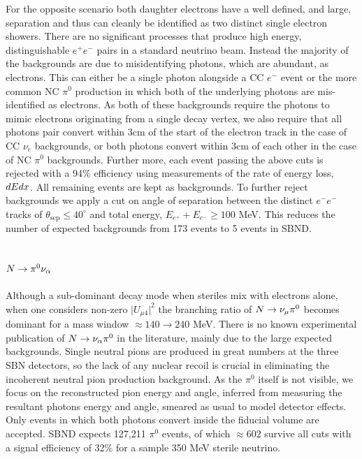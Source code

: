 \documentclass[11pt, a4paper]{article}
\def\ster{\ensuremath N}
\begin{document}
For the opposite scenario both daughter electrons have a well defined, and
large, separation and thus can cleanly be identified as two distinct single
electron showers. There are no significant processes that produce high energy,
distinguishable $e^+e^-$ pairs in a standard neutrino beam.  Instead the
majority of the backgrounds are due to misidentifying photons, which are
abundant, as electrons. This can either be a single photon alongside a CC $e^-$
event or the more common NC $\pi^0$ production in which both of the underlying
photons are mis-identified as electrons. As both of these backgrounds require
the photons to mimic electrons originating from a single decay vertex, we also
require that all photons pair convert within 3cm of the start of the electron
track in the case of CC $\nu_e$ backgrounds, or both photons convert within 3cm
of each other in the case of NC $\pi^0$ backgrounds. Further more, each event
passing the above cuts is rejected with a 94\% efficiency using measurements of
the rate of energy loss, $dE\/dx$. All remaining events are kept as
backgrounds. To further reject backgrounds we apply a cut on angle of
separation between the distinct $e^-e^-$ tracks of $\theta_\text{sep}\leq 40
^\circ$ and total energy, $E_{e^+}+E_{e^-} \geq 100$ MeV. This reduces the
number of expected backgrounds from 173 events to 5 events in SBND. 

\subsection{$\ster\rightarrow \pi^0 \nu_\alpha$}

Although a sub-dominant decay mode when steriles mix with electrons alone, when
one considers non-zero $\vert U_{\mu4}\vert^2$ the branching ratio of $\ster
\rightarrow \nu_\mu \pi^0$ becomes dominant for a mass window $\approx 140
\rightarrow 240$ MeV. There is no known experimental publication of $\ster
\rightarrow \nu_\alpha \pi^0$ in the literature, mainly due to the large
expected backgrounds. Single neutral pions are produced in great numbers at the
three SBN detectors, so the lack of any nuclear recoil is crucial in
eliminating the incoherent neutral pion production background. As the $\pi^0$
itself is not visible, we focus on the reconstructed pion energy and angle,
inferred from measuring the resultant photons energy and angle, smeared as
usual to model detector effects. Only events in which both photons convert
inside the fiducial volume are accepted. SBND expects 127,211 $\pi^0$ events,
of which $\approx 602$ survive all cuts with a signal efficiency of 32\% for a
sample 350 MeV sterile neutrino. \\ 
\end{document}
